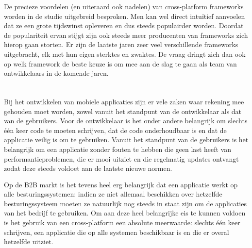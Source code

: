 De precieze voordelen (en uiteraard ook nadelen) van cross-platform frameworks
worden in de studie uitgebreid besproken. Men kan wel direct intuïtief aanvoelen
dat ze een grote tijdswinst opleveren en dus steeds populairder worden. Doordat
de populariteit ervan stijgt zijn ook steeds meer producenten van frameworks
zich hierop gaan storten. Er zijn de laatste jaren zeer veel verschillende
frameworks uitgebracht, elk met hun eigen sterktes en zwaktes. De vraag dringt
zich dan ook op welk framework de beste keuze is om mee aan de slag te gaan als
team van ontwikkelaars in de komende jaren. 

\section{}
\label{sec:probleemstelling}


Bij het ontwikkelen van mobiele applicaties zijn er vele zaken waar rekening mee gehouden moet worden, zowel vanuit het standpunt van de ontwikkelaar als dat van de gebruikers. Voor de ontwikkelaar is het onder andere belangrijk om slechts één keer code te moeten schrijven, dat de code onderhoudbaar is en dat de applicatie veilig is om te gebruiken. Vanuit het standpunt van de gebruikers is het belangrijk om een applicatie zonder fouten te hebben die geen last heeft van performantieproblemen, die er mooi uitziet en die regelmatig updates ontvangt zodat deze steeds voldoet aan de laatste nieuwe normen. 

Op de B2B markt is het tevens heel erg belangrijk dat een applicatie werkt op alle besturingssystemen: indien ze niet allemaal beschikken over hetzelfde besturingssysteem moeten ze natuurlijk nog steeds in staat zijn om de applicaties van het bedrijf te gebruiken. Om aan deze heel belangrijke eis te kunnen voldoen is het gebruik van een cross-platform een absolute meerwaarde: slechts één keer schrijven, een applicatie die op alle systemen beschikbaar is en die er overal hetzelfde uitziet. 

